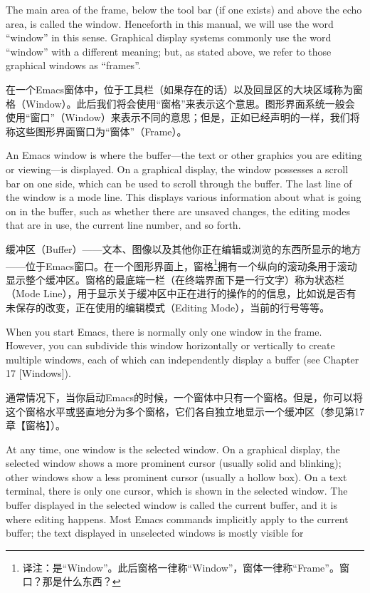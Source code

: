 The main area of the frame, below the tool bar (if one exists) and above the echo area, is
called the window. Henceforth in this manual, we will use the word “window” in this sense.
Graphical display systems commonly use the word “window” with a different meaning; but,
as stated above, we refer to those graphical windows as “frames”.
\par
在一个Emacs窗体中，位于工具栏（如果存在的话）以及回显区的大块区域称为窗格（Window）。此后我们将会使用“窗格”来表示这个意思。图形界面系统一般会使用“窗口”（Window）来表示不同的意思；但是，正如已经声明的一样，我们将称这些图形界面窗口为“窗体”（Frame）。\par
An Emacs window is where the buffer—the text or other graphics you are editing or
viewing—is displayed. On a graphical display, the window possesses a scroll bar on one
side, which can be used to scroll through the buffer. The last line of the window is a mode
line. This displays various information about what is going on in the buffer, such as whether
there are unsaved changes, the editing modes that are in use, the current line number, and
so forth.
\par
缓冲区（Buffer）——文本、图像以及其他你正在编辑或浏览的东西所显示的地方——位于Emacs窗口。在一个图形界面上，窗格\footnote{译注：是“Window”。此后窗格一律称“Window”，窗体一律称“Frame”。窗口？那是什么东西？}拥有一个纵向的滚动条用于滚动显示整个缓冲区。窗格的最底端一栏（在终端界面下是一行文字）称为状态栏（Mode Line），用于显示关于缓冲区中正在进行的操作的的信息，比如说是否有未保存的改变，正在使用的编辑模式（Editing Mode），当前的行号等等。\par
When you start Emacs, there is normally only one window in the frame. However, you
can subdivide this window horizontally or vertically to create multiple windows, each of
which can independently display a buffer (see Chapter 17 [Windows]).
\par
通常情况下，当你启动Emacs的时候，一个窗体中只有一个窗格。但是，你可以将这个窗格水平或竖直地分为多个窗格，它们各自独立地显示一个缓冲区（参见第17章【窗格】）。\par
At any time, one window is the selected window. On a graphical display, the selected
window shows a more prominent cursor (usually solid and blinking); other windows show a
less prominent cursor (usually a hollow box). On a text terminal, there is only one cursor,
which is shown in the selected window. The buffer displayed in the selected window is
called the current buffer, and it is where editing happens. Most Emacs commands implicitly
apply to the current buffer; the text displayed in unselected windows is mostly visible for
